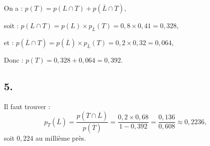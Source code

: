 \documentclass[10pt]{article}
\begin{document}
On a : \(p(T) = p(L \cap T) + p(\overline{L} \cap T)\),

soit : \(p(L \cap T) = p(L) \times p_L(T) = 0{,}8 \times 0{,}41 = 0{,}328\),

et : \(p(\overline{L} \cap T) = p(\overline{L}) \times p_{\overline{L}}(T) = 0{,}2 \times 0{,}32 = 0{,}064\),

Donc : \(p(T) = 0{,}328 + 0{,}064 = 0{,}392\).

\subsection*{5.}

Il faut trouver :
\[
p_{\overline{T}}({\overline{L}}) = \dfrac{p({\overline{T}} \cap {\overline{L}})}{p({\overline{T}})} = \dfrac{0{,}2 \times 0{,}68}{1 - 0{,}392} = \dfrac{0{,}136}{0{,}608} \approx 0{,}2236,
\]
soit \(0{,}224\) au millième près.
\end{document}

